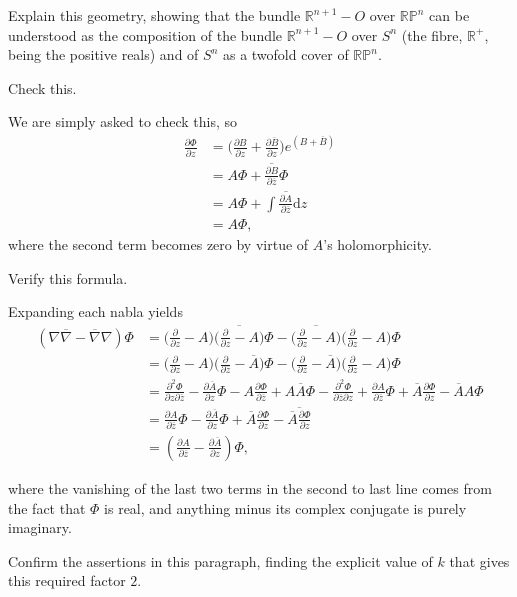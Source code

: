 \documentclass[../the-road-to-reality.tex]{subfiles}
\begin{document}
\begin{questions}
  \question Explain this geometry, showing that the bundle $\mathbb{R}^{n+1}-O$
    over $\mathbb{RP}^n$ can be understood as the composition of the bundle
    $\mathbb{R}^{n+1}-O$ over $S^n$ (the fibre, $\mathbb{R}^{+}$, being the
    positive reals) and of $S^n$ as a twofold cover of $\mathbb{RP}^n$.

  \question Check this.

    \begin{solution}
      We are simply asked to check this, so
      \begin{align*}
        \frac{\partial\Phi}{\partial{z}} &= \Big(\frac{\partial{B}}{\partial{z}} + \frac{\partial{\overline{B}}}{\partial{z}}\Big)e^{(B+\overline{B})} \\
&= A\Phi + \overline{\frac{\partial{B}}{\partial{\overline{z}}}}\Phi \\
&= A\Phi + \overline{\int\frac{\partial{A}}{\partial\overline{z}}\mathrm{d}z} \\
&= A\Phi,
      \end{align*}
      where the second term becomes zero by virtue of $A$'s holomorphicity.
    \end{solution}
    
\question Verify this formula.

\begin{solution}
  Expanding each nabla yields
  \begin{align*}
    (\nabla\overline{\nabla} - \overline{\nabla}\nabla)\Phi &= \Big(\frac{\partial}{\partial{z}} - A\Big)\overline{\Big(\frac{\partial}{\partial{z}} - A\Big)}\Phi - \overline{\Big(\frac{\partial}{\partial{z}} - A\Big)}\Big(\frac{\partial}{\partial{z}} - A\Big)\Phi \\
&= \Big(\frac{\partial}{\partial{z}} - A\Big)\Big(\frac{\partial}{\partial\overline{z}} - \overline{A}\Big)\Phi - \Big(\frac{\partial}{\partial\overline{z}} - \overline{A}\Big)\Big(\frac{\partial}{\partial{z}} - A)\Phi \\
&= \frac{\partial^2\Phi}{\partial{z}\partial\overline{z}} - \frac{\partial\overline{A}}{\partial{z}}\Phi - A\frac{\partial\Phi}{\partial\overline{z}} + A\overline{A}\Phi - \frac{\partial^2\Phi}{\partial\overline{z}\partial{z}} + \frac{\partial{A}}{\partial\overline{z}}\Phi + \overline{A}\frac{\partial\Phi}{\partial{z}} - \overline{A}A\Phi \\
&= \frac{\partial{A}}{\partial\overline{z}}\Phi - \frac{\partial\overline{A}}{\partial{z}}\Phi + \overline{A}\frac{\partial\Phi}{\partial{z}} - \overline{\overline{A}\frac{\partial\Phi}{\partial{z}}} \\
&= (\frac{\partial{A}}{\partial\overline{z}} - \frac{\partial\overline{A}}{\partial{z}})\Phi,
  \end{align*}
  
where the vanishing of the last two terms in the second to last line comes from
the fact that $\Phi$ is real, and anything minus its complex conjugate is purely imaginary.
\end{solution}

\question Confirm the assertions in this paragraph, finding the explicit value
  of $k$ that gives this required factor $2$.
    
\end{questions}
\end{document}

